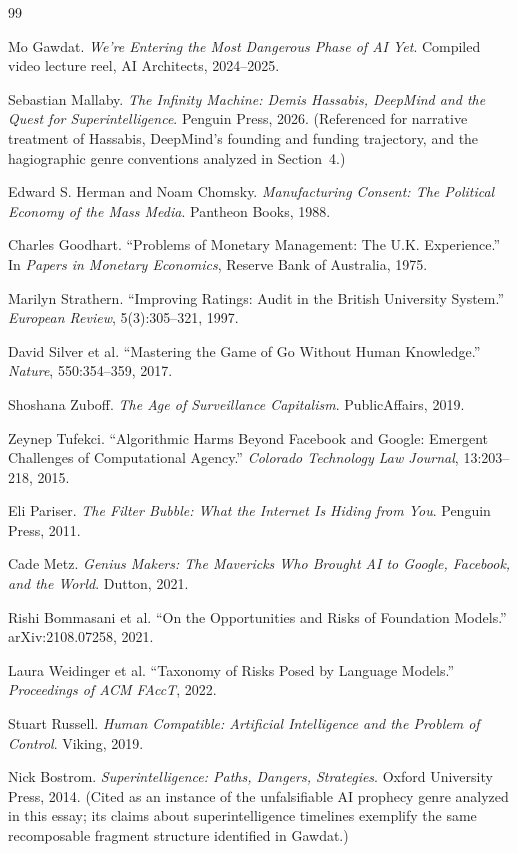 \documentclass[12pt, a4paper]{article}
\begin{document}
\begin{thebibliography}{99}

Mo Gawdat.
\newblock \textit{We're Entering the Most Dangerous Phase of AI Yet}.
\newblock Compiled video lecture reel, AI Architects, 2024--2025.

Sebastian Mallaby.
\newblock \textit{The Infinity Machine: Demis Hassabis, DeepMind and the Quest
for Superintelligence}.
\newblock Penguin Press, 2026.
\newblock (Referenced for narrative treatment of Hassabis, DeepMind's founding
and funding trajectory, and the hagiographic genre conventions analyzed
in Section~4.)

Edward S. Herman and Noam Chomsky.
\newblock \textit{Manufacturing Consent: The Political Economy of the Mass Media}.
\newblock Pantheon Books, 1988.

Charles Goodhart.
\newblock ``Problems of Monetary Management: The U.K. Experience.''
\newblock In \textit{Papers in Monetary Economics}, Reserve Bank of Australia, 1975.

Marilyn Strathern.
\newblock ``Improving Ratings: Audit in the British University System.''
\newblock \textit{European Review}, 5(3):305--321, 1997.

David Silver et al.
\newblock ``Mastering the Game of Go Without Human Knowledge.''
\newblock \textit{Nature}, 550:354--359, 2017.

Shoshana Zuboff.
\newblock \textit{The Age of Surveillance Capitalism}.
\newblock PublicAffairs, 2019.

Zeynep Tufekci.
\newblock ``Algorithmic Harms Beyond Facebook and Google: Emergent Challenges
of Computational Agency.''
\newblock \textit{Colorado Technology Law Journal}, 13:203--218, 2015.

Eli Pariser.
\newblock \textit{The Filter Bubble: What the Internet Is Hiding from You}.
\newblock Penguin Press, 2011.

Cade Metz.
\newblock \textit{Genius Makers: The Mavericks Who Brought AI to Google,
Facebook, and the World}.
\newblock Dutton, 2021.

Rishi Bommasani et al.
\newblock ``On the Opportunities and Risks of Foundation Models.''
\newblock arXiv:2108.07258, 2021.

Laura Weidinger et al.
\newblock ``Taxonomy of Risks Posed by Language Models.''
\newblock \textit{Proceedings of ACM FAccT}, 2022.

Stuart Russell.
\newblock \textit{Human Compatible: Artificial Intelligence and the Problem
of Control}.
\newblock Viking, 2019.

Nick Bostrom.
\newblock \textit{Superintelligence: Paths, Dangers, Strategies}.
\newblock Oxford University Press, 2014.
\newblock (Cited as an instance of the unfalsifiable AI prophecy genre
analyzed in this essay; its claims about superintelligence timelines
exemplify the same recomposable fragment structure identified in Gawdat.)

\end{thebibliography}
\end{document}
